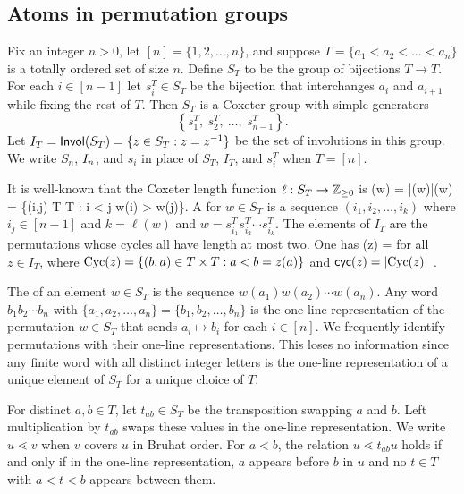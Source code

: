 \documentclass[10pt]{article}
\begin{document}
\subsection{Atoms in permutation groups}\label{Sn-sect}

Fix an integer $n>0$, let $[n] = \{1,2,\dots,n\}$,
and suppose $T = \{a_1<a_2<\dots<a_n\}$ is a totally ordered set of size $n$.
Define $S_T$ to be the group of bijections $T \to T$.
For each $i \in [n-1]$ let $s^{T}_i \in S_T$ be the bijection that interchanges $a_i$ and $a_{i+1}$ while fixing the rest of $T$.
Then $S_T$ is a Coxeter group with simple generators
$$\left\{ s^{T}_1,\ s^{T}_2,\ \dots,\ s^{T}_{n-1}\right\}.$$ Let
$
I_T = \mathsf{Invol}(S_T) = \{ z \in S_T : z=z^{-1}\}
$
be the set of involutions in this group.
We write $S_n$, $I_n$, and $s_i$ in place of $S_T$, $I_T$, and $s^{T}_i$ when $T = [n]$.

It is well-known that the Coxeter length function $\ell : S_T \to \mathbb{Z}_{\geq 0}$ is
\be\label{inv-def}
\ell(w) = |\Inv(w)|\quad{}\Inv(w) = \{(i,j) \in T \times T : i < j w(i) > w(j)\}.
\ee
%
A  for $w \in S_T$ is a sequence $(i_1,i_2,\dots,i_k)$ where $i_j \in [n-1]$ and $k=\ell(w)$
and $w = s^T_{i_1}s^T_{i_2}\cdots s^T_{i_k}$.
The elements of $I_T$ are the permutations whose cycles all have length at most two.
One has
\be\label{cyc-def}
\ellinv(z) = 
\ee
for all $z \in I_T$,
where $\mathrm{Cyc}(z) = \{ (b,a) \in T\times T : a < b=z(a)\}$ and $\textsf{cyc}(z) = |\mathrm{Cyc}(z)|$
 \cite[\S2.1]{HMP1}.


The  of an element $w \in S_T$ is the sequence $w(a_1)w(a_2)\cdots w(a_n)$.
Any word $b_1b_2\cdots b_n$ with $\{a_1,a_2,\dots,a_n\} = \{b_1,b_2,\dots,b_n\}$ is the one-line representation of the permutation $w \in S_{T}$ that sends $a_i\mapsto b_i$ for each $i \in [n]$.
We frequently identify permutations with their one-line representations. This loses no information since 
any finite word with all distinct integer letters is
the one-line representation of a unique element of $S_T$ for a unique choice of $T$. 


For distinct $a,b\in T$, let $t_{ab}\in S_T$ be the transposition
swapping $a$ and $b$.  Left multiplication by $t_{ab}$ swaps these
values in the one-line representation.
We write $u\lessdot v$ when $v$ covers $u$ in Bruhat order.
For $a<b$, the relation $u\lessdot t_{ab}u$ holds if and only if in the one-line representation,
$a$ appears before $b$ in $u$ and no $t\in T$ with $a<t<b$ appears between them.
\end{document}
